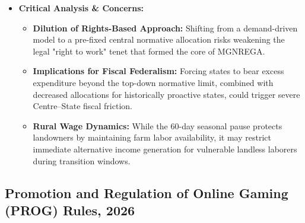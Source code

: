 \begin{itemize}
    \item \textbf{Critical Analysis \& Concerns:}
    \begin{itemize}
        \item \textbf{Dilution of Rights-Based Approach:} Shifting from a demand-driven model to a pre-fixed central normative allocation risks weakening the legal "right to work" tenet that formed the core of MGNREGA.
        \item \textbf{Implications for Fiscal Federalism:} Forcing states to bear excess expenditure beyond the top-down normative limit, combined with decreased allocations for historically proactive states, could trigger severe Centre–State fiscal friction.
        \item \textbf{Rural Wage Dynamics:} While the 60-day seasonal pause protects landowners by maintaining farm labor availability, it may restrict immediate alternative income generation for vulnerable landless laborers during transition windows.
    \end{itemize}
\end{itemize}

\subsection{Promotion and Regulation of Online Gaming (PROG) Rules, 2026}

